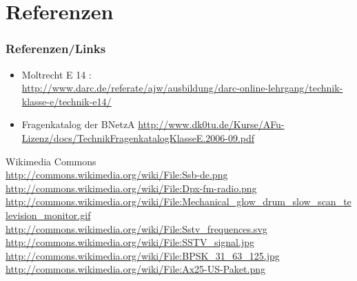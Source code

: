 \section*{Referenzen}
\begin{frame}
    \frametitle{Referenzen/Links}
    
    \footnotesize
    \begin{itemize}
        \item Moltrecht E 14 : \\
              \url{http://www.darc.de/referate/ajw/ausbildung/darc-online-lehrgang/technik-klasse-e/technik-e14/}
		\item Fragenkatalog der BNetzA
			\url{http://www.dk0tu.de/Kurse/AFu-Lizenz/docs/TechnikFragenkatalogKlasseE.2006-09.pdf}
    \end{itemize}

\end{frame}

\begin{thebibliography}{}
        Wikimedia Commons \\
                    \url{http://commons.wikimedia.org/wiki/File:Ssb-de.png}\\
                    \url{http://commons.wikimedia.org/wiki/File:Dpx-fm-radio.png}\\
                    \url{http://commons.wikimedia.org/wiki/File:Mechanical_glow_drum_slow_scan_television_monitor.gif}\\
                    \url{http://commons.wikimedia.org/wiki/File:Sstv_frequences.svg}\\
                    \url{http://commons.wikimedia.org/wiki/File:SSTV_signal.jpg}\\
                    \url{http://commons.wikimedia.org/wiki/File:BPSK_31_63_125.jpg}\\
                    \url{http://commons.wikimedia.org/wiki/File:Ax25-US-Paket.png}
\end{thebibliography} 



